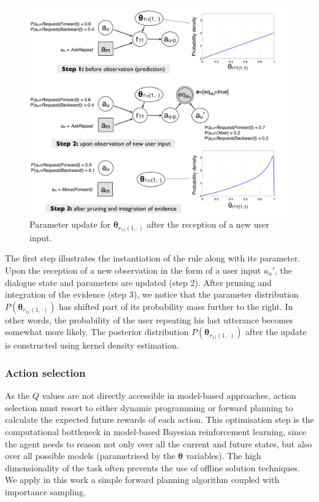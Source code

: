 \begin{figure}[h]
\centering
\includegraphics[scale=0.30]{imgs/learningexample.pdf}
\caption{Parameter update for $\boldsymbol\theta_{r_{11}(1,\cdot)}$ after the reception of a new user input. }
\label{fig:learningexample}
\end{figure}

The first step illustrates the instantiation of the rule along with its parameter. Upon the reception of a new observation in the form of a user input $a_u'$, the dialogue state and parameters are updated (step 2). After pruning and integration of the evidence (step 3), we notice that the parameter distribution $P(\boldsymbol\theta_{r_{11}(1,\cdot)})$ has shifted part of its probability mass further to the right. In other words, the probability of the user repeating his last utterance becomes somewhat more likely. The posterior distribution $P(\boldsymbol\theta_{r_{11}(1,\cdot)})$ after the update is constructed using kernel density estimation. 

\subsubsection*{Action selection}

 As the $Q$ values are not directly accessible in model-based approaches, action selection must resort to either dynamic programming or forward planning to calculate the expected future rewards of each action.  This optimisation step is the computational bottleneck in model-based Bayesian reinforcement learning, since the agent needs to reason not only over all the current and future states, but also over all possible models (parametrised by the $\boldsymbol\theta$ variables).  The high dimensionality of the task often prevents the use of offline solution techniques. We apply in this work a simple forward planning algorithm coupled with importance sampling. 


